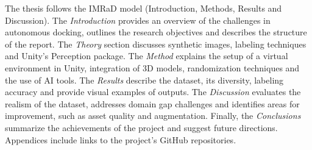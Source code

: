 The thesis follows the IMRaD model (Introduction, Methods, Results and Discussion). The \textit{Introduction} provides an overview of the challenges in autonomous docking, outlines the research objectives and describes the structure of the report. The \textit{Theory} section discusses synthetic images, labeling techniques and Unity's Perception package. The \textit{Method} explains the setup of a virtual environment in Unity, integration of 3D models, randomization techniques and the use of AI tools. The \textit{Results} describe the dataset, its diversity, labeling accuracy and provide visual examples of outputs. The \textit{Discussion} evaluates the realism of the dataset, addresses domain gap challenges and identifies areas for improvement, such as asset quality and augmentation. Finally, the \textit{Conclusions} summarize the achievements of the project and suggest future directions.\\


\noindent Appendices include links to the project's GitHub repositories.
